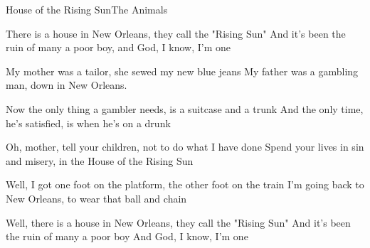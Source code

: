 \begin{song}{House of the Rising Sun}{The Animals}{}


There is a house in New Orleans, they call the "Rising Sun"
And it's been the ruin of many a poor boy, and God, I know, I'm one

My mother was a tailor, she sewed my new blue jeans
My father was a gambling man, down in New Orleans.

Now the only thing a gambler needs, is a suitcase and a trunk
And the only time, he's satisfied, is when he's on a drunk

Oh, mother, tell your children, not to do what I have done
Spend your lives in sin and misery, in the House of the Rising Sun

Well, I got one foot on the platform, the other foot on the train
I'm going back to New Orleans, to wear that ball and chain

Well, there is a house in New Orleans, they call the "Rising Sun"
And it's been the ruin of many a poor boy
And God, I know, I'm one
\end{song}